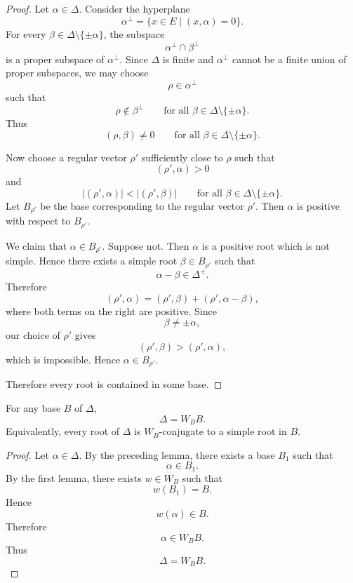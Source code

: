 \begin{proof}
    Let \(\alpha\in\Delta\). Consider the hyperplane
    \[
        \alpha^\perp
        =
        \{x\in E\mid (x,\alpha)=0\}.
    \]
    For every \(\beta\in\Delta\setminus\{\pm\alpha\}\), the subspace
    \[
        \alpha^\perp\cap\beta^\perp
    \]
    is a proper subspace of \(\alpha^\perp\). Since \(\Delta\) is finite and
    \(\alpha^\perp\) cannot be a finite union of proper subspaces, we may choose
    \[
        \rho\in\alpha^\perp
    \]
    such that
    \[
        \rho\notin \beta^\perp
        \qquad
        \text{for all } \beta\in\Delta\setminus\{\pm\alpha\}.
    \]
    Thus
    \[
        (\rho,\beta)\neq 0
        \qquad
        \text{for all } \beta\in\Delta\setminus\{\pm\alpha\}.
    \]

    Now choose a regular vector \(\rho'\) sufficiently close to \(\rho\) such that
    \[
        (\rho',\alpha)>0
    \]
    and
    \[
        |(\rho',\alpha)|
        <
        |(\rho',\beta)|
        \qquad
        \text{for all } \beta\in\Delta\setminus\{\pm\alpha\}.
    \]
    Let \(B_{\rho'}\) be the base corresponding to the regular vector \(\rho'\).
    Then \(\alpha\) is positive with respect to \(B_{\rho'}\).

    We claim that \(\alpha\in B_{\rho'}\). Suppose not. Then \(\alpha\) is a
    positive root which is not simple. Hence there exists a simple root
    \(\beta\in B_{\rho'}\) such that
    \[
        \alpha-\beta\in\Delta^+.
    \]
    Therefore
    \[
        (\rho',\alpha)
        =
        (\rho',\beta)+(\rho',\alpha-\beta),
    \]
    where both terms on the right are positive. Since
    \[
        \beta\neq \pm\alpha,
    \]
    our choice of \(\rho'\) gives
    \[
        (\rho',\beta)
        >
        (\rho',\alpha),
    \]
    which is impossible. Hence \(\alpha\in B_{\rho'}\).

    Therefore every root is contained in some base.
\end{proof}

\begin{corollary}
    For any base \(B\) of \(\Delta\),
    \[
        \Delta=W_B B.
    \]
    Equivalently, every root of \(\Delta\) is \(W_B\)-conjugate to a simple root
    in \(B\).
\end{corollary}

\begin{proof}
    Let \(\alpha\in\Delta\). By the preceding lemma, there exists a base \(B_1\)
    such that
    \[
        \alpha\in B_1.
    \]
    By the first lemma, there exists \(w\in W_B\) such that
    \[
        w(B_1)=B.
    \]
    Hence
    \[
        w(\alpha)\in B.
    \]
    Therefore
    \[
        \alpha\in W_B B.
    \]
    Thus
    \[
        \Delta=W_B B.
    \]
\end{proof}

